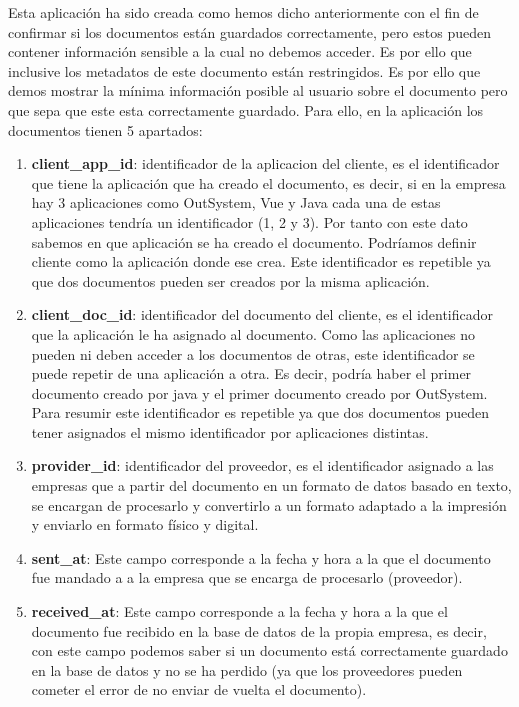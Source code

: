 \documentclass[draft]{scrbook}
\begin{document}
Esta aplicación ha sido creada como hemos dicho anteriormente con el fin de confirmar si los documentos están guardados correctamente, pero estos pueden contener información sensible a la cual no debemos acceder. Es por ello que inclusive los metadatos de este documento están restringidos.  Es por ello que demos mostrar la mínima información posible al usuario sobre el documento pero que sepa que este esta correctamente guardado. Para ello, en la aplicación los documentos tienen 5 apartados:
\begin{enumerate}
    \item \textbf{client\_app\_id}:
    identificador de la aplicacion del cliente, es el identificador que tiene la aplicación que ha creado el documento, es decir, si en la empresa hay 3 aplicaciones como OutSystem, Vue y Java cada una de estas aplicaciones tendría un identificador (1, 2 y 3). Por tanto con este dato sabemos en que aplicación se ha creado el documento. Podríamos definir cliente como la aplicación donde ese crea. Este identificador es repetible ya que dos documentos pueden ser creados por la misma aplicación.


    \item \textbf{client\_doc\_id}:
    identificador del documento del cliente, es el identificador que la aplicación le ha asignado al documento. Como las aplicaciones no pueden ni deben acceder a los documentos de otras, este identificador se puede repetir de una aplicación a otra. Es decir, podría haber el primer documento creado por java y el primer documento creado por OutSystem. Para resumir este identificador es repetible ya que dos documentos pueden tener asignados el mismo identificador por aplicaciones distintas.


    \item \textbf{provider\_id}: identificador del proveedor, es el identificador asignado a las empresas que a partir del documento en un formato de datos basado en texto, se encargan de procesarlo y convertirlo a un formato adaptado a la impresión y enviarlo en formato físico y digital.

    \item \textbf{sent\_at}:
    Este campo corresponde a la fecha y hora a la que el documento fue mandado a a la empresa que se encarga de procesarlo (proveedor).
   
    \item \textbf{received\_at}: 
    Este campo corresponde a la fecha y hora a la que el documento fue recibido en la base de datos de la propia empresa, es decir, con este campo podemos saber si un documento está correctamente guardado en la base de datos y no se ha perdido (ya que los proveedores pueden cometer el error de no enviar de vuelta el documento).

\end{enumerate}
\end{document}
